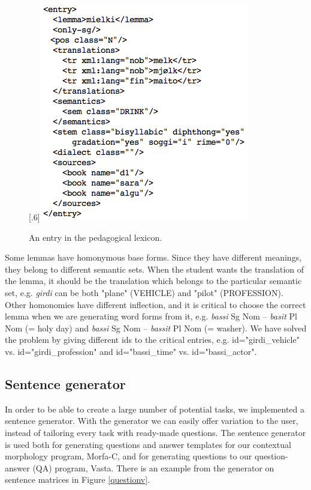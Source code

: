 \documentclass[11pt]{article}
\begin{document}
\begin{figure}[tbp]
\begin{center}
\scalebox{.6}[.6]{\includegraphics{presentation/img/nounlexicon3.png}}\\
\caption{An entry in the pedagogical lexicon.}
\label{nounlex}
\end{center}
\end{figure}

Some lemmas have homonymous base forms. Since they have different meanings, they belong to different semantic sets. When the student wants the translation of the lemma, it should be the translation which belongs to the particular semantic set, e.g. \textit{girdi} can be both "plane" (VEHICLE) and "pilot" (PROFESSION). Other homonomies have different inflection, and it is critical to choose the correct lemma when we are generating word forms from it, e.g. \textit{bassi} Sg Nom -- \textit{basit} Pl Nom (= holy day) and \textit{bassi} Sg Nom -- \textit{bassit} Pl Nom (= washer). We have solved the problem by giving different ids to the critical entries, e.g. id="girdi\_vehicle" vs. 
id="girdi\_profession" and id="bassi\_time" vs. id="bassi\_actor".


\subsection{Sentence generator}\label{set}
In order to be able to create a large number of potential tasks, we implemented a sentence generator. With the generator we can easily offer variation to the user, instead of tailoring every task with ready-made questions. The sentence generator is used both for generating questions and answer templates for our contextual morphology program, Morfa-C, and for generating questions to our question-answer (QA) program, Vasta. There is an example from the generator on sentence matrices in Figure \ref{questionv}.
\end{document}
